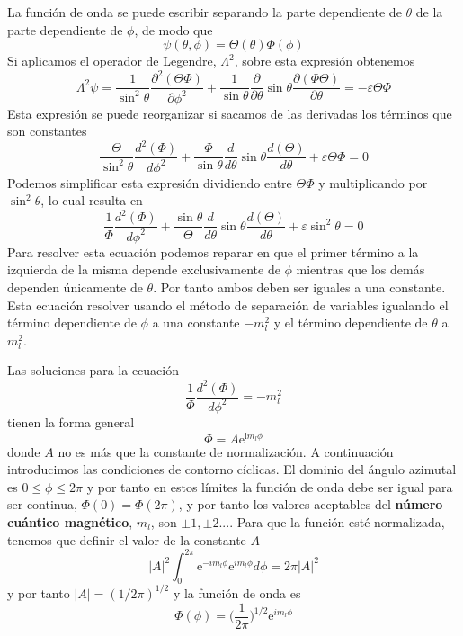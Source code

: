La función de onda se puede escribir separando la parte
dependiente de $\theta$ de la parte dependiente de $\phi$,
de modo que
\begin{equation}
    \psi(\theta, \phi)=\Theta(\theta)\Phi(\phi)
\end{equation}
Si aplicamos el operador de Legendre, $\Lambda^2$, sobre
esta expresión obtenemos
\begin{equation}
    \Lambda^2\psi=\frac{1}{\sin^2\theta}\frac{\partial^2(\Theta\Phi)}{\partial\phi^2}+
    \frac{1}{\sin\theta}\frac{\partial}{\partial\theta}\sin\theta\frac{\partial(\Phi\Theta)}{\partial\theta}=-\varepsilon\Theta\Phi
\end{equation}
Esta expresión se puede reorganizar si sacamos de las 
derivadas los términos que son constantes 
\begin{equation}
    \frac{\Theta}{\sin^2\theta}\frac{d^2(\Phi)}{d\phi^2} + 
    \frac{\Phi}{\sin\theta}\frac{d}{d\theta}\sin\theta\frac{d(\Theta)}{d\theta}+
    \varepsilon\Theta\Phi=0
\end{equation}
Podemos simplificar esta expresión dividiendo entre $\Theta\Phi$ y 
multiplicando por $\sin^2\theta$, lo cual resulta en
\begin{equation}
    \frac{1}{\Phi}\frac{d^2(\Phi)}{d\phi^2} + 
    \frac{\sin\theta}{\Theta}\frac{d}{d\theta}\sin\theta\frac{d(\Theta)}{d\theta}+
    \varepsilon\sin^2\theta=0\label{eq:rotor}
\end{equation}
Para resolver esta ecuación podemos reparar en que el
primer término a la izquierda de la misma depende 
exclusivamente de $\phi$ mientras que los demás 
dependen únicamente de $\theta$. Por tanto ambos deben
ser iguales a una constante. Esta ecuación resolver
usando el método de separación de variables igualando
el término dependiente de $\phi$ a una constante 
$-m^2_l$ y el término dependiente de $\theta$ a $m^2_l$.

Las soluciones para la ecuación 
\begin{equation}
    \frac{1}{\Phi}\frac{d^2(\Phi)}{d\phi^2}=-m^2_l
\end{equation}
tienen la forma general
\begin{equation}
    \Phi=A\mathrm{e}^{\mathrm{i}m_l\phi}
\end{equation}
donde $A$ no es más que la constante de normalización. A 
continuación introducimos las condiciones de contorno cíclicas.
El dominio del ángulo azimutal es $0\leq \phi\leq2\pi$
y por tanto en estos límites la función de onda debe ser
igual para ser continua, $\Phi(0)=\Phi(2\pi)$, y por tanto
los valores aceptables del \textbf{número cuántico magnético},
$m_l$, son $\pm 1,\pm 2...$. Para que la función esté
normalizada, tenemos que definir el valor de
la constante $A$
\begin{equation}
    |A|^2\int_0^{2\pi}\mathrm{e}^{-im_l\phi}\mathrm{e}^{im_l\phi}d\phi=
    2\pi|A|^2
\end{equation}
y por tanto $|A|=(1/2\pi)^{1/2}$ y la función de onda es
\begin{equation}
    \Phi(\phi)=\bigg(\frac{1}{2\pi}\bigg)^{1/2}\mathrm{e}^{im_l\phi}
\end{equation}

